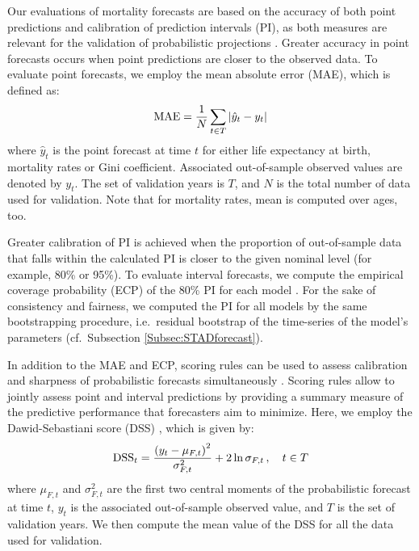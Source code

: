 \documentclass[11pt, a4paper]{article}
\begin{document}
Our evaluations of mortality forecasts are based on the accuracy of both point predictions and calibration of prediction intervals (PI), as both measures are relevant for the validation of probabilistic projections \citep{chatfield2000time}. Greater accuracy in point forecasts occurs when point predictions are closer to the observed data. To evaluate point forecasts, we employ the mean absolute error (MAE), which is defined as:
%
\begin{equation}\label{Eq:MAE}
	\mathrm{MAE} = \frac{1}{N} \sum_{t \in T} \left| \hat{y}_t - y_t \right|  \notag 
\end{equation}
% 
where $\hat{y}_t$ is the point forecast at time $t$ for either life expectancy at birth, mortality rates or Gini coefficient. Associated out-of-sample observed values are denoted by $y_t$. The set of validation years is $T$, and $N$ is the total number of data used for validation. Note that for mortality rates, mean is computed over ages, too. 

Greater calibration of PI is achieved when the proportion of out-of-sample data that falls within the calculated PI is closer to the given nominal level (for example, 80\% or 95\%). To evaluate interval forecasts, we compute the empirical coverage probability (ECP) of the 80\% PI for each model \cite[as in, for example,][]{shang2011point,raftery2013bayesian}. For the sake of consistency and fairness, we computed the PI for all models by the same bootstrapping procedure, i.e.~residual bootstrap of the time-series of the model's parameters (cf.~Subsection \ref{Subsec:STADforecast}).

In addition to the MAE and ECP, scoring rules can be used to assess calibration and sharpness of probabilistic forecasts simultaneously \cite[for a review, see][]{gneiting2014probabilistic}. Scoring rules allow to jointly assess point and interval predictions by providing a summary measure of the predictive performance that forecasters aim to minimize. Here, we employ the Dawid-Sebastiani score (DSS) \citep{dawid1999coherent}, which is given by:
%
\begin{equation}\label{Eq:DSS}
\mathrm{DSS}_t = \frac{\left(y_t-\mu_{F,t}\right)^2}{\sigma^2_{F,t}} + 2 \ln \sigma_{F,t}  \,, \quad t \in T \notag 
\end{equation}
%
where $\mu_{F,t}$ and $\sigma^2_{F,t}$ are the first two central moments of the probabilistic forecast at time $t$, $y_t$ is the associated out-of-sample observed value, and $T$ is the set of validation years. We then compute the mean value of the DSS for all the data used for validation. 
\end{document}
